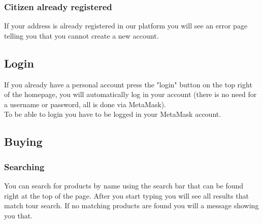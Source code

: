 	\subsubsection{Citizen already registered}
	If your address is already registered in our platform you will see an
	error page telling you that you cannot create a new account.
	\subsection{Login}
	If you already have a personal account press the "login" button on the 
	top right of the homepage, you will automatically log in your account 
	(there is no need for a username or password, all is done via MetaMask). 
	\\To be able to login you have to be logged in your MetaMask account.
	\subsection{Buying}
	\subsubsection{Searching}
	You can search for products by name using the search bar that can be found 
	right at the top of the page. After you start typing you will see all 
	results that match tour search. If no matching products are found you will 
	a message showing you that.
